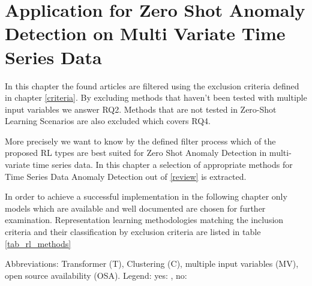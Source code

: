 \section{Application for Zero Shot Anomaly Detection on Multi Variate Time Series Data}\label{application}
In this chapter the found articles are filtered using the exclusion criteria defined in chapter \ref{criteria}. By excluding methods that haven't been tested with multiple input variables we answer RQ2. Methods that are not tested in Zero-Shot Learning Scenarios are also excluded which covers RQ4.

More precisely we want to know by the defined filter process which of the proposed RL types are best suited for Zero Shot Anomaly Detection in multi-variate time series data. In this chapter a selection of appropriate methods for Time Series Data Anomaly Detection out of \ref{review} is extracted.

 In order to achieve a successful implementation in the following chapter only models which are available and well documented are chosen for further examination. Representation learning methodologies matching the inclusion criteria and their classification by exclusion criteria are listed in table \ref{tab_rl_methods}
 \begin{table}
   \caption{Abbreviations: Transformer (T), Clustering (C), multiple input variables (MV), open source availability (OSA). Legend: yes: \cmark, no: \xmark}\label{tab_rl_methods}
   
 \end{table}
